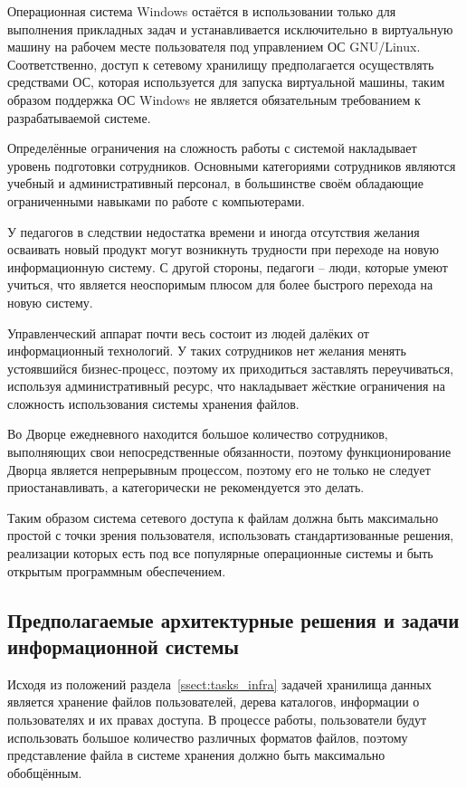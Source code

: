 \documentclass[utf8,usehyperref,12pt]{G7-32}
\begin{document}
Операционная система Windows остаётся в использовании только для выполнения прикладных задач и устанавливается исключительно в виртуальную машину на рабочем месте пользователя под управлением ОС GNU/Linux. Соответственно, доступ к сетевому хранилищу предполагается осуществлять средствами ОС, которая используется для запуска виртуальной машины, таким образом поддержка ОС Windows не является обязательным требованием к разрабатываемой системе.

Определённые ограничения на сложность работы с системой накладывает уровень подготовки сотрудников. Основными категориями сотрудников являются учебный и административный персонал, в большинстве своём обладающие ограниченными навыками по работе с компьютерами.

У педагогов в следствии недостатка времени и иногда отсутствия желания осваивать новый продукт могут возникнуть трудности при переходе на новую информационную систему. С другой стороны, педагоги – люди, которые умеют учиться, что является неоспоримым плюсом для более быстрого перехода на новую систему.


Управленческий аппарат почти весь состоит из людей далёких от информационный технологий. У таких сотрудников нет желания менять устоявшийся бизнес-процесс, поэтому их приходиться заставлять переучиваться, используя административный ресурс, что накладывает жёсткие ограничения на сложность использования системы хранения файлов.

Во Дворце ежедневного находится большое количество сотрудников, выполняющих свои непосредственные обязанности, поэтому функционирование Дворца является непрерывным процессом, поэтому его не только не следует приостанавливать,
а категорически не рекомендуется это делать.

Таким образом система сетевого доступа к файлам должна быть максимально простой с точки зрения пользователя, использовать стандартизованные решения, реализации которых есть под все популярные операционные системы и быть открытым программным обеспечением.

\subsection{Предполагаемые архитектурные решения и задачи информационной системы}\label{ssect_arch_tasks}
Исходя из положений раздела~\ref{ssect:tasks_infra} задачей хранилища данных является хранение файлов пользователей, дерева каталогов, информации о пользователях и их правах доступа. В процессе работы, пользователи будут использовать большое количество различных форматов файлов, поэтому представление файла в системе хранения должно быть максимально обобщённым. 
\end{document}

